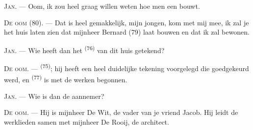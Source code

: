 %
%
%

\VUsaut{6.0mm}
\VUsaut{1.4mm}
\VUsaut{2.2mm}

\VUsaut{3.0mm}

\textsc{Jan}. --- Oom, ik zou heel graag willen weten hoe men een  bouwt.

\textsc{De oom} (80). --- Dat is heel gemakkelijk, mijn jongen, kom met mij mee, ik zal je het
huis laten zien dat mijnheer Bernard (79) laat bouwen en dat ik zal bewonen.

\textsc{Jan}. --- Wie heeft dan het  \textsuperscript{(76)} van dit huis
getekend?

\textsc{De oom}. ---  \textsuperscript{(75)}; hij heeft een heel
duidelijke tekening voorgelegd die goedgekeurd werd, en 
\textsuperscript{(77)} is met de werken begonnen.

\textsc{Jan}. --- Wie is dan de aannemer?

\textsc{De oom}. --- Hij is mijnheer De Wit, de vader van je vriend Jacob. Hij leidt de
werklieden samen met mijnheer De Rooij, de architect.

